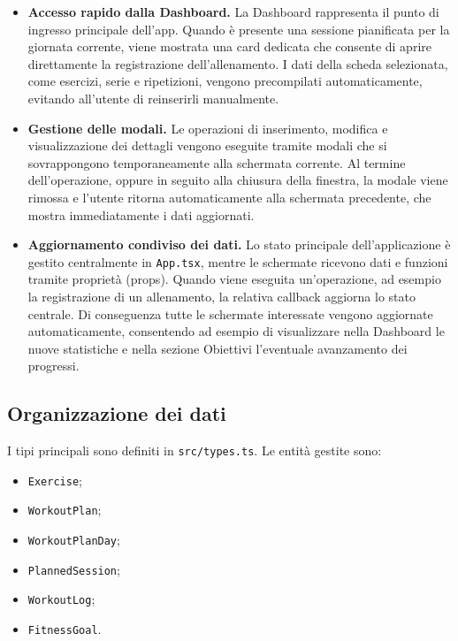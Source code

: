 \documentclass[11pt,a4paper]{article}
\begin{document}
\begin{itemize}

\item \textbf{Accesso rapido dalla Dashboard.} La Dashboard rappresenta il punto di ingresso principale dell'app. Quando è presente una sessione pianificata per la giornata corrente, viene mostrata una card dedicata che consente di aprire direttamente la registrazione dell'allenamento. I dati della scheda selezionata, come esercizi, serie e ripetizioni, vengono precompilati automaticamente, evitando all'utente di reinserirli manualmente.

\item \textbf{Gestione delle modali.} Le operazioni di inserimento, modifica e visualizzazione dei dettagli vengono eseguite tramite modali che si sovrappongono temporaneamente alla schermata corrente. Al termine dell'operazione, oppure in seguito alla chiusura della finestra, la modale viene rimossa e l'utente ritorna automaticamente alla schermata precedente, che mostra immediatamente i dati aggiornati.

\item \textbf{Aggiornamento condiviso dei dati.} Lo stato principale dell'applicazione è gestito centralmente in \texttt{App.tsx}, mentre le schermate ricevono dati e funzioni tramite proprietà (props). Quando viene eseguita un'operazione, ad esempio la registrazione di un allenamento, la relativa callback aggiorna lo stato centrale. Di conseguenza tutte le schermate interessate vengono aggiornate automaticamente, consentendo ad esempio di visualizzare nella Dashboard le nuove statistiche e nella sezione Obiettivi l'eventuale avanzamento dei progressi.

\end{itemize}
\subsection{Organizzazione dei dati}

I tipi principali sono definiti in \texttt{src/types.ts}. Le entità gestite sono:

\begin{itemize}
  \item \texttt{Exercise};
  \item \texttt{WorkoutPlan};
  \item \texttt{WorkoutPlanDay};
  \item \texttt{PlannedSession};
  \item \texttt{WorkoutLog};
  \item \texttt{FitnessGoal}.
\end{itemize}
\end{document}
